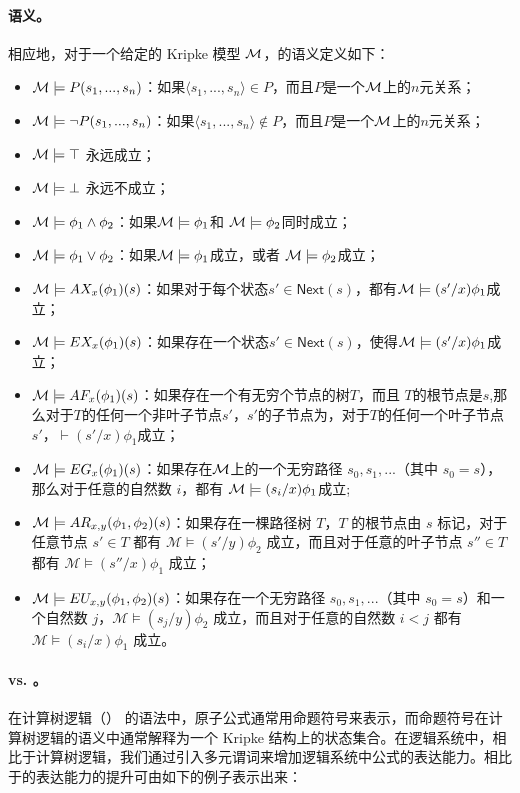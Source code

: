 \paragraph{语义。}相应地，对于一个给定的 Kripke 模型 $\cal M$，的语义定义如下：
\begin{itemize}
	\item ${\cal M}\models P(s_1,...,s_n)$：如果$\langle s_1,...,s_n\rangle\in P$，而且$P$是一个$\cal M$上的$n$元关系；
	\item ${\cal M}\models \neg P(s_1,...,s_n)$：如果$\langle s_1,...,s_n\rangle\notin P$，而且$P$是一个$\cal M$上的$n$元关系；
	\item ${\cal M}\models \top$ 永远成立；
	\item ${\cal M}\models \bot$ 永远不成立；
	\item ${\cal M}\models \phi_1\wedge\phi_2$：如果${\cal M}\models \phi_1$和 ${\cal M}\models \phi_2$同时成立；
	\item ${\cal M}\models \phi_1\vee\phi_2$：如果${\cal M}\models \phi_1$成立，或者 ${\cal M}\models \phi_2$成立；
	\item ${\cal M}\models AX_x(\phi_1)(s)$：如果对于每个状态$s'\in\textsf{Next}(s)$，都有${\cal M}\models (s'/x)\phi_1$成立；
	\item ${\cal M}\models EX_x(\phi_1)(s)$：如果存在一个状态$s'\in\textsf{Next}(s)$，使得${\cal M}\models (s'/x)\phi_1$成立；
	\item ${\cal M}\models AF_x(\phi_1)(s)$：如果存在一个有无穷个节点的树$T$，而且 $T$的根节点是$s$,那么对于$T$的任何一个非叶子节点$s'$，$s'$的子节点为，对于$T$的任何一个叶子节点$s'$，$\vdash (s'/x)\phi_1$成立；
	\item ${\cal M}\models EG_x(\phi_1)(s)$：如果存在$\cal M$上的一个无穷路径 $s_0,s_1,...$（其中 $s_0 = s$），那么对于任意的自然数 $i$，都有 ${\cal M}\models (s_i/x)\phi_1$成立;
	\item ${\cal M}\models AR_{x, y}(\phi_1,\phi_2)(s)$：如果存在一棵路径树 $T$，$T$ 的根节点由 $s$ 标记，对于任意节点 $s'\in T$ 都有 $\mathcal{M}\models (s'/y)\phi_2$ 成立，而且对于任意的叶子节点 $s''\in T$ 都有 $\mathcal{M}\models (s''/x)\phi_1$ 成立；
	\item ${\cal M}\models EU_{x, y}(\phi_1,\phi_2)(s)$：如果存在一个无穷路径 $s_0,s_1,...$（其中 $s_0=s$）和一个自然数 $j$，$\mathcal{M}\models(s_j/y)\phi_2$ 成立，而且对于任意的自然数 $i<j$ 都有 $\mathcal{M}\models (s_i/x)\phi_1$ 成立。
\end{itemize}


\paragraph{\CTL{} vs. \CTLP{}。}在计算树逻辑（\CTL）\cite{EmersonC82,EmersonH85} 的语法中，原子公式通常用命题符号来表示，而命题符号在计算树逻辑的语义中通常解释为一个 Kripke 结构上的状态集合。在逻辑系统\CTLP{}中，相比于计算树逻辑，我们通过引入多元谓词来增加逻辑系统中公式的表达能力。\CTLP{}相比于\CTL{}的表达能力的提升可由如下的例子表示出来：

